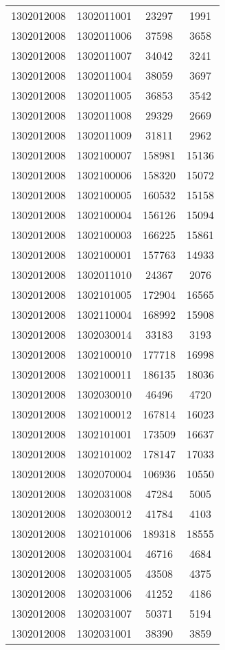 \begin{longtable}{llcc}
1302012008 & 1302011001 & 23297 & 1991\\
1302012008 & 1302011006 & 37598 & 3658\\
1302012008 & 1302011007 & 34042 & 3241\\
1302012008 & 1302011004 & 38059 & 3697\\
1302012008 & 1302011005 & 36853 & 3542\\
1302012008 & 1302011008 & 29329 & 2669\\
1302012008 & 1302011009 & 31811 & 2962\\
1302012008 & 1302100007 & 158981 & 15136\\
1302012008 & 1302100006 & 158320 & 15072\\
1302012008 & 1302100005 & 160532 & 15158\\
1302012008 & 1302100004 & 156126 & 15094\\
1302012008 & 1302100003 & 166225 & 15861\\
1302012008 & 1302100001 & 157763 & 14933\\
1302012008 & 1302011010 & 24367 & 2076\\
1302012008 & 1302101005 & 172904 & 16565\\
1302012008 & 1302110004 & 168992 & 15908\\
1302012008 & 1302030014 & 33183 & 3193\\
1302012008 & 1302100010 & 177718 & 16998\\
1302012008 & 1302100011 & 186135 & 18036\\
1302012008 & 1302030010 & 46496 & 4720\\
1302012008 & 1302100012 & 167814 & 16023\\
1302012008 & 1302101001 & 173509 & 16637\\
1302012008 & 1302101002 & 178147 & 17033\\
1302012008 & 1302070004 & 106936 & 10550\\
1302012008 & 1302031008 & 47284 & 5005\\
1302012008 & 1302030012 & 41784 & 4103\\
1302012008 & 1302101006 & 189318 & 18555\\
1302012008 & 1302031004 & 46716 & 4684\\
1302012008 & 1302031005 & 43508 & 4375\\
1302012008 & 1302031006 & 41252 & 4186\\
1302012008 & 1302031007 & 50371 & 5194\\
1302012008 & 1302031001 & 38390 & 3859\\

\end{longtable}

